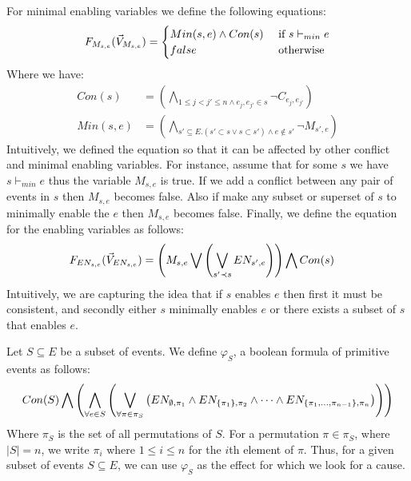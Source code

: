 \noindent
For minimal enabling variables we define the following equations:
$$
    F_{M_{s,e}}(\vec V_{M_{s,e}}) = \begin{cases}
        Min(s,e) \wedge Con(s) & \text{ if } s \vdash_{min} e \\
        false                  & \text{ otherwise }
    \end{cases}
$$
Where we have:
\begin{align*}
    Con(s)   & =   \left(
    \bigwedge_{ 1\leq j<j' \leq n \wedge e_j,e_{j'} \in s}
    \neg C_{e_j,e_{j'}}
    \right)               \\
    Min(s,e) & = \left(
    \bigwedge_{s' \subseteq E. (s' \subset s \vee s \subset s')
        \wedge e \notin s'}
    \neg M_{s',e}
    \right)
\end{align*}
Intuitively, we defined the equation so that it can be affected by 
other conflict and minimal enabling variables.
For instance, assume that for some $s$ we have $s \vdash_{min} e$
thus the variable $M_{s,e}$ is true.
If we add a conflict between any pair of events in $s$ then $M_{s,e}$
becomes false.
Also if make any subset or superset of $s$ to minimally enable the $e$ then
$M_{s,e}$ becomes false.
Finally, we define the equation for the enabling variables as follows:
\begin{align*}
    F_{EN_{s,e}}(\vec V_{EN_{s,e}}) & =
    \left(
    M_{s,e} \bigvee
    \left(
    \bigvee_{s'\prec s}EN_{s',e}
    \right)
    \right)
    \bigwedge
    Con(s)
\end{align*}
Intuitively, we are capturing the idea that if $s$ enables $e$ then first 
it must be consistent, and secondly either $s$ minimally enables $e$ or 
there exists a subset of $s$ that enables $e$.

\noindent Let $S \subseteq E$ be a subset of events.
We define $\varphi_S$, a boolean formula of primitive
events as follows:
\begin{align*}
    Con(S)
    \bigwedge
    \left(
        \bigwedge_{\forall e \in S}
        \left(
            \bigvee_{\forall \pi \in \pi_S} 
            \left(
                EN_{\emptyset,\pi_1} \wedge
                EN_{\{\pi_1\},\pi_2} \wedge
                \dots
                \wedge
                EN_{\{\pi_1,...,\pi_{n-1}\},\pi_n}
            \right)
        \right)
    \right)
\end{align*}
\noindent Where $\pi_S$ is the set of all permutations of $S$.
For a permutation $\pi \in \pi_S$, where $|S| = n$, 
we write $\pi_i$ where $1 \leq i \leq n$ for the $i$th 
element of $\pi$.
Thus, for a given subset of events $S \subseteq E$, 
we can use $\varphi_S$ as the effect for which we look
for a cause.

\pagebreak

